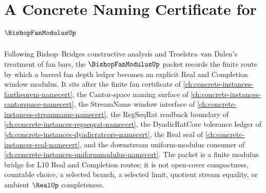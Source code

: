 \chapter{A Concrete Naming Certificate for $\BishopFanModulusUp$}
\label{ch:concrete-instances-bishop-fan-modulus-namecert}

Following Bishop--Bridges constructive analysis and Troelstra--van Dalen's treatment of fan bars, the $\BishopFanModulusUp$ packet records the finite route by which a barred fan depth ledger becomes an explicit Real and Completion window modulus. It sits after the finite fan certificate of \autoref{ch:concrete-instances-fantheorem-namecert}, the Cantor-space naming surface of \autoref{ch:concrete-instances-cantorspace-namecert}, the StreamName window interface of \autoref{ch:concrete-instances-streamname-namecert}, the RegSeqRat readback boundary of \autoref{ch:concrete-instances-regseqrat-namecert}, the DyadicRatCore tolerance ledger of \autoref{ch:concrete-instances-dyadicratcore-namecert}, the Real seal of \autoref{ch:concrete-instances-real-namecert}, and the downstream uniform-modulus consumer of \autoref{ch:concrete-instances-uniformmodulus-namecert}. The packet is a finite modulus bridge for L10 Real and Completion routes; it is not open-cover compactness, countable choice, a selected branch, a selected limit, quotient stream equality, or ambient $\RealUp$ completeness.

